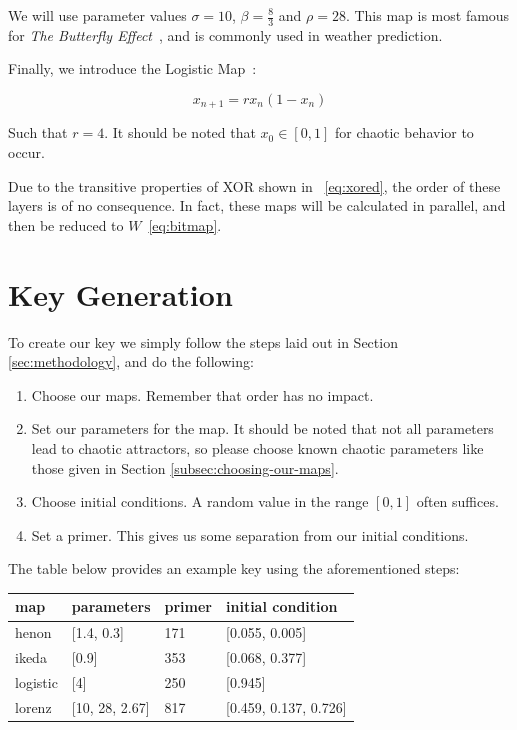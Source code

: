 \documentclass[conference]{IEEEtran}
\begin{document}
\noindent We will use parameter values $\sigma=10$, $\beta=\frac{8}{3}$ and $\rho=28$.
This map is most famous for \textit{The Butterfly Effect}~\cite{Alligood}, and is commonly used in weather prediction.

Finally, we introduce the Logistic Map~\cite{Qin2017}:

\begin{equation}\label{eq:Logistic}
    x_{n+1} = r x_n (1 - x_n)
\end{equation}

\noindent Such that $r=4$.
It should be noted that $x_0 \in [0,1]$ for chaotic behavior to occur.

Due to the transitive properties of XOR shown in ~\eqref{eq:xored}, the order of these layers is of no consequence.
In fact, these maps will be calculated in parallel, and then be reduced to $W$~\eqref{eq:bitmap}.

\section{Key Generation}\label{subsec:key-generation}

To create our key we simply follow the steps laid out in Section \ref{sec:methodology}, and do the following:

\begin{enumerate}
    \item Choose our maps. Remember that order has no impact.
    \item Set our parameters for the map. It should be noted that not all parameters lead to chaotic attractors, so please choose known chaotic parameters like those given in Section \ref{subsec:choosing-our-maps}.
    \item Choose initial conditions. A random value in the range $[0, 1]$ often suffices.
    \item Set a primer. This gives us some separation from our initial conditions.
\end{enumerate}

\noindent The table below provides an example key using the aforementioned steps:

\begin{tabular}{llll}
    \hline
    \textbf{map} & \textbf{parameters} & \textbf{primer} & \textbf{initial condition} \\
    \hline
    henon & [1.4, 0.3] & 171 & [0.055, 0.005]\\
    ikeda & [0.9] & 353 & [0.068, 0.377]\\
    logistic & [4] & 250 & [0.945]\\
    lorenz & [10, 28, 2.67] & 817 & [0.459, 0.137, 0.726]\\
    \hline
\end{tabular}
\\
\end{document}
